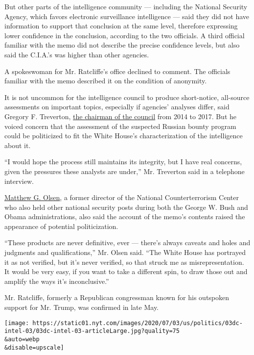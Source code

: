 But other parts of the intelligence community --- including the National
Security Agency, which favors electronic surveillance intelligence ---
said they did not have information to support that conclusion at the
same level, therefore expressing lower confidence in the conclusion,
according to the two officials. A third official familiar with the memo
did not describe the precise confidence levels, but also said the
C.I.A.'s was higher than other agencies.

A spokeswoman for Mr. Ratcliffe's office declined to comment. The
officials familiar with the memo described it on the condition of
anonymity.

It is not uncommon for the intelligence council to produce short-notice,
all-source assessments on important topics, especially if agencies'
analyses differ, said Gregory F. Treverton,
\href{https://www.dni.gov/index.php/newsroom/press-releases/press-releases-2014/item/1116-new-national-intelligence-council-chairman-arrives}{the
chairman of the council} from 2014 to 2017. But he voiced concern that
the assessment of the suspected Russian bounty program could be
politicized to fit the White House's characterization of the
intelligence about it.

``I would hope the process still maintains its integrity, but I have
real concerns, given the pressures these analysts are under,'' Mr.
Treverton said in a telephone interview.

\href{https://www.nytimes.com/2014/07/10/world/middleeast/Matthew-G-Olsen-to-Leave-the-National-Counterterrorism-Center.html}{Matthew
G. Olsen}, a former director of the National Counterterrorism Center who
also held other national security posts during both the George W. Bush
and Obama administrations, also said the account of the memo's contents
raised the appearance of potential politicization.

``These products are never definitive, ever --- there's always caveats
and holes and judgments and qualifications,'' Mr. Olsen said. ``The
White House has portrayed it as not verified, but it's never verified,
so that struck me as misrepresentation. It would be very easy, if you
want to take a different spin, to draw those out and amplify the ways
it's inconclusive.''

Mr. Ratcliffe, formerly a Republican congressman known for his outspoken
support for Mr. Trump, was confirmed in late May.

\texttt{[image: https://static01.nyt.com/images/2020/07/03/us/politics/03dc-intel-03/03dc-intel-03-articleLarge.jpg?quality=75\\\&auto=webp\\\&disable=upscale]}

